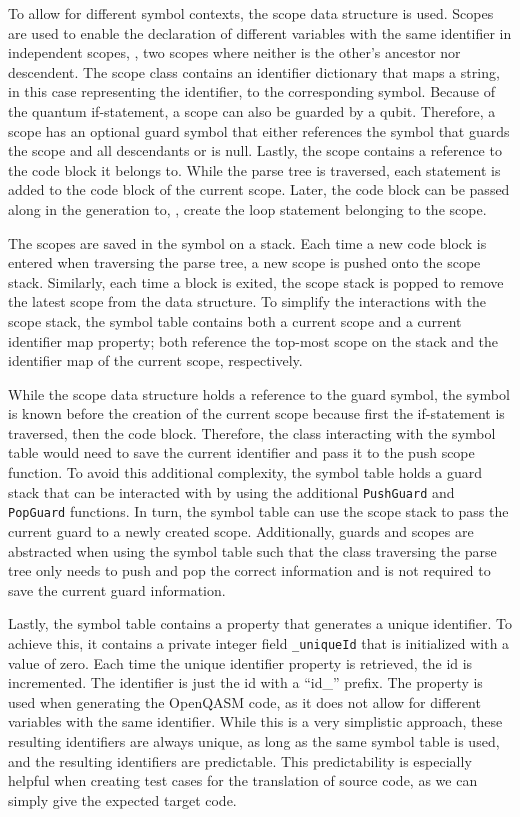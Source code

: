 To allow for different symbol contexts, the scope data structure is used. Scopes are used to enable the declaration of different variables with the same identifier in independent scopes, \ie, two scopes where neither is the other's ancestor nor descendent. The scope class contains an identifier dictionary that maps a string, in this case representing the identifier, to the corresponding symbol. Because of the quantum if-statement, a scope can also be guarded by a qubit. Therefore, a scope has an optional guard symbol that either references the symbol that guards the scope and all descendants or is null. Lastly, the scope contains a reference to the code block it belongs to. While the parse tree is traversed, each statement is added to the code block of the current scope. Later, the code block can be passed along in the generation to, \eg, create the loop statement belonging to the scope.

The scopes are saved in the symbol on a stack. Each time a new code block is entered when traversing the parse tree, a new scope is pushed onto the scope stack. Similarly, each time a block is exited, the scope stack is popped to remove the latest scope from the data structure. To simplify the interactions with the scope stack, the symbol table contains both a current scope and a current identifier map property; both reference the top-most scope on the stack and the identifier map of the current scope, respectively.

While the scope data structure holds a reference to the guard symbol, the symbol is known before the creation of the current scope because first the if-statement is traversed, then the code block. Therefore, the class interacting with the symbol table would need to save the current identifier and pass it to the push scope function. To avoid this additional complexity, the symbol table holds a guard stack that can be interacted with by using the additional \texttt{PushGuard} and \texttt{PopGuard} functions. In turn, the symbol table can use the scope stack to pass the current guard to a newly created scope. Additionally, guards and scopes are abstracted when using the symbol table such that the class traversing the parse tree only needs to push and pop the correct information and is not required to save the current guard information.

Lastly, the symbol table contains a property that generates a unique identifier. To achieve this, it contains a private integer field \texttt{\_uniqueId} that is initialized with a value of zero. Each time the unique identifier property is retrieved, the id is incremented. The identifier is just the id with a ``id\_'' prefix. The property is used when generating the OpenQASM code, as it does not allow for different variables with the same identifier. While this is a very simplistic approach, these resulting identifiers are always unique, as long as the same symbol table is used, and the resulting identifiers are predictable. This predictability is especially helpful when creating test cases for the translation of source code, as we can simply give the expected target code.

